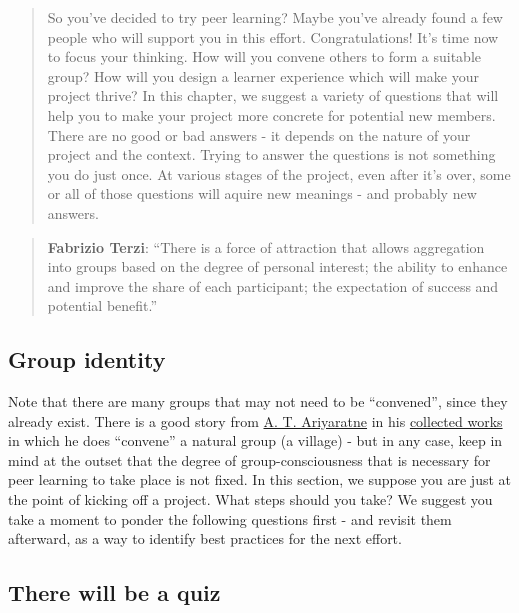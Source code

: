 \begin{quote}
So you've decided to try peer learning? Maybe you've already found a few
people who will support you in this effort. Congratulations! It's time
now to focus your thinking. How will you convene others to form a
suitable group? How will you design a learner experience which will make
your project thrive? In this chapter, we suggest a variety of questions
that will help you to make your project more concrete for potential new
members. There are no good or bad answers - it depends on the nature of
your project and the context. Trying to answer the questions is not
something you do just once. At various stages of the project, even after
it's over, some or all of those questions will aquire new meanings - and
probably new answers.
\end{quote}

\begin{quote}
\textbf{Fabrizio Terzi}: ``There is a force of attraction that allows
aggregation into groups based on the degree of personal interest; the
ability to enhance and improve the share of each participant; the
expectation of success and potential benefit.''
\end{quote}

\hypertarget{group-identity}{%
\subsection{Group identity}\label{group-identity}}

Note that there are many groups that may not need to be ``convened'',
since they already exist. There is a good story from
\href{http://www.sarvodayausa.org/learn/a-t-ariyartne/}{A. T.
Ariyaratne} in his
\href{http://www.sarvodaya.org/about/philosophy/collected-works-vol-1/rural-self-help}{collected
works} in which he does ``convene'' a natural group (a village) - but in
any case, keep in mind at the outset that the degree of
group-consciousness that is necessary for peer learning to take place is
not fixed. In this section, we suppose you are just at the point of
kicking off a project. What steps should you take? We suggest you take a
moment to ponder the following questions first - and revisit them
afterward, as a way to identify best practices for the next effort.

\hypertarget{there-will-be-a-quiz}{%
\subsection{There will be a quiz}\label{there-will-be-a-quiz}}

